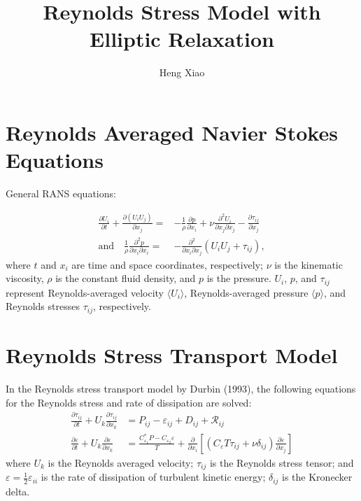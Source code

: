 \documentclass[11pt]{article}
\title{Reynolds Stress Model with Elliptic Relaxation}
\author{Heng Xiao}
\newcommand{\rans}[1]{\langle #1 \rangle}
\begin{document}
\maketitle

\section{Reynolds Averaged Navier Stokes Equations}

General RANS equations:

\begin{subequations} \label{eq:common}
  \begin{align}
  \frac{\partial  U_i}{\partial t}+\frac{\partial
    \left(U_i U_j \right)}{\partial  x_j}  = & 
  - \frac{1}{\rho} \frac{\partial p}{\partial
    x_i}  +\nu\frac{\partial^2 U_i}{\partial x_j \partial
    x_j}   - \frac{\partial \tau_{ij}}{\partial x_j} 
     \label{eq:common-u}  \\
\textrm{and} \quad
\frac{1}{\rho} \frac{\partial^2  p}{\partial x_i\partial x_i}  = &
  - \frac{\partial^2}{\partial x_i\partial
    x_j}\left( U_i  U_j + \tau_{ij}
  \right), \label{eq:common-p}
\end{align}
\end{subequations}
where $t$ and $x_i$ are time and space coordinates, respectively;
$\nu$ is the kinematic viscosity, $\rho$ is the constant fluid
density, and $p$ is the pressure.  $U_i$, $p$, and $\tau_{ij}$
represent Reynolds-averaged velocity $\rans{U_i}$, Reynolds-averaged
pressure $\rans{p}$, and Reynolds stresses $\tau_{ij}$, respectively.

\section{Reynolds Stress Transport Model}

In the Reynolds stress transport model by Durbin (1993), the following
 equations for the Reynolds stress and rate of dissipation are solved:
\begin{align}
\frac{\partial \tau_{ij}}{\partial t}+U_{k}
\frac{\partial  \tau_{ij}}{\partial
  x_{k}} & =
P_{ij}  - \varepsilon_{ij} + D_{ij} + \mathcal{R}_{ij}  \\
\frac{\partial \varepsilon}{\partial t} +  U_k \frac{\partial
  \varepsilon }{\partial x_k} & =  
\frac{C_{\varepsilon_1}^* P - C_{\varepsilon_2} \varepsilon}{T} +
\frac{\partial}{\partial x_{i}}  \left[
  \left( C_{\varepsilon} T \tau_{ij} + \nu \delta_{ij} \right)  \frac{\partial
      \varepsilon} {\partial x_{j}} \right] \label{eqn:epsilon}
\end{align}
where $U_{k}$ is the Reynolds averaged velocity; $\tau_{ij}$ is the
Reynolds stress tensor; and $\varepsilon = \frac{1}{2}
\varepsilon_{ii}$ is the rate of dissipation of turbulent kinetic
energy; $\delta_{ij}$ is the Kronecker delta.
\end{document}
